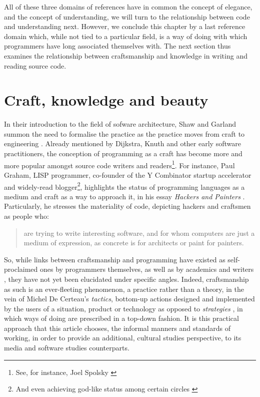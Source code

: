 All of these three domains of references have in common the concept of elegance, and the concept of understanding, we will turn to the relationship between code and understanding next. However, we conclude this chapter by a last reference domain which, while not tied to a particular field, is a way of doing with which programmers have long associated themselves with. The next section thus examines the relationship between craftsmanship and knowledge in writing and reading source code.

\pagebreak

\section{Craft, knowledge and beauty}
\label{sec:craft}

In their introduction to the field of sofware architecture, Shaw and Garland summon the need to formalise the practice as the practice moves from craft to engineering \citep{shaw_software_1996}. Already mentioned by Dijkstra, Knuth and other early software practitioners, the conception of programming as a craft has become more and more popular amongst source code writers and readers\footnote{See, for instance, Joel Spolsky \citep{spolosky_craftsmanship_2003,seibel_coders_2009}}.  For instance, Paul Graham, LISP programmer, co-founder of the Y Combinator startup accelerator and widely-read blogger\footnote{And even achieving god-like status among certain circles \citep{eadicicco_startup_2014}}, highlights the status of programming languages as a medium and craft as a way to approach it, in his essay \emph{Hackers and Painters} \citep{graham_hackers_2003}. Particularly, he stresses the materiality of code, depicting hackers and craftsmen as people who:

\begin{quote}
  are trying to write interesting software, and for whom computers are just a medium of expression, as concrete is for architects or paint for painters.
\end{quote}

So, while links between craftsmanship and programming have existed as self-proclaimed ones by programmers themselves, as well as by academics and writers  \citep{sennett_craftsman_2009,chandra_geek_2014}, they have not yet been elucidated under specific angles. Indeed, craftsmanship as such is an ever-fleeting phenomenon, a practice rather than a theory, in the vein of Michel De Certeau's \textit{tactics}, bottom-up actions designed and implemented by the users of a situation, product or technology as opposed to \textit{strategies} \citep{certeau_invention_1990}, in which ways of doing are prescribed in a top-down fashion. It is this practical approach that this article chooses, the informal manners and standards of working, in order to provide an additional, cultural studies perspective, to its media and software studies counterparts.

